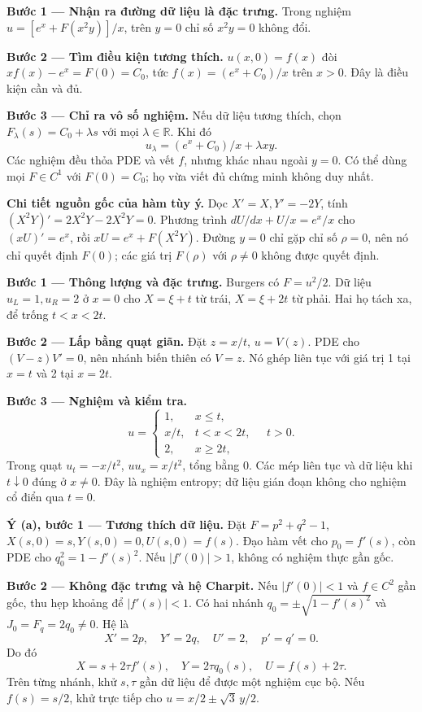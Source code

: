 \textbf{Bước 1 — Nhận ra đường dữ liệu là đặc trưng.} Trong nghiệm $u=[e^x+F(x^2y)]/x$, trên $y=0$ chỉ số $x^2y=0$ không đổi.

\textbf{Bước 2 — Tìm điều kiện tương thích.} $u(x,0)=f(x)$ đòi $xf(x)-e^x=F(0)=C_0$, tức $f(x)=(e^x+C_0)/x$ trên $x>0$. Đây là điều kiện cần và đủ.

\textbf{Bước 3 — Chỉ ra vô số nghiệm.} Nếu dữ liệu tương thích, chọn $F_\lambda(s)=C_0+\lambda s$ với mọi $\lambda\in\mathbb R$. Khi đó
\[u_\lambda=(e^x+C_0)/x+\lambda xy.\]
Các nghiệm đều thỏa PDE và vết $f$, nhưng khác nhau ngoài $y=0$. Có thể dùng mọi $F\in C^1$ với $F(0)=C_0$; họ vừa viết đủ chứng minh không duy nhất.

\textbf{Chi tiết nguồn gốc của hàm tùy ý.} Dọc $X'=X,Y'=-2Y$, tính $(X^2Y)'=2X^2Y-2X^2Y=0$. Phương trình $dU/dx+U/x=e^x/x$ cho $(xU)'=e^x$, rồi $xU=e^x+F(X^2Y)$. Đường $y=0$ chỉ gặp chỉ số $\rho=0$, nên nó chỉ quyết định $F(0)$; các giá trị $F(\rho)$ với $\rho\ne0$ không được quyết định.

\textbf{Bước 1 — Thông lượng và đặc trưng.} Burgers có $F=u^2/2$. Dữ liệu $u_L=1,u_R=2$ ở $x=0$ cho $X=\xi+t$ từ trái, $X=\xi+2t$ từ phải. Hai họ tách xa, để trống $t<x<2t$.

\textbf{Bước 2 — Lấp bằng quạt giãn.} Đặt $z=x/t$, $u=V(z)$. PDE cho $(V-z)V'=0$, nên nhánh biến thiên có $V=z$. Nó ghép liên tục với giá trị 1 tại $x=t$ và 2 tại $x=2t$.

\textbf{Bước 3 — Nghiệm và kiểm tra.}
\[u=\begin{cases}1,&x\le t,\\x/t,&t<x<2t,\\2,&x\ge2t,\end{cases}\quad t>0.\]
Trong quạt $u_t=-x/t^2$, $uu_x=x/t^2$, tổng bằng 0. Các mép liên tục và dữ liệu khi $t\downarrow0$ đúng ở $x\ne0$. Đây là nghiệm entropy; dữ liệu gián đoạn không cho nghiệm cổ điển qua $t=0$.

\textbf{Ý (a), bước 1 — Tương thích dữ liệu.} Đặt $F=p^2+q^2-1$, $X(s,0)=s,Y(s,0)=0,U(s,0)=f(s)$. Đạo hàm vết cho $p_0=f'(s)$, còn PDE cho $q_0^2=1-f'(s)^2$. Nếu $|f'(0)|>1$, không có nghiệm thực gần gốc.

\textbf{Bước 2 — Không đặc trưng và hệ Charpit.} Nếu $|f'(0)|<1$ và $f\in C^2$ gần gốc, thu hẹp khoảng để $|f'(s)|<1$. Có hai nhánh $q_0=\pm\sqrt{1-f'(s)^2}$ và $J_0=F_q=2q_0\ne0$. Hệ là
\[X'=2p,\quad Y'=2q,\quad U'=2,\quad p'=q'=0.\]
Do đó
\[X=s+2\tau f'(s),\quad Y=2\tau q_0(s),\quad U=f(s)+2\tau.\]
Trên từng nhánh, khử $s,\tau$ gần dữ liệu để được một nghiệm cục bộ. Nếu $f(s)=s/2$, khử trực tiếp cho $u=x/2\pm\sqrt3\,y/2$.

